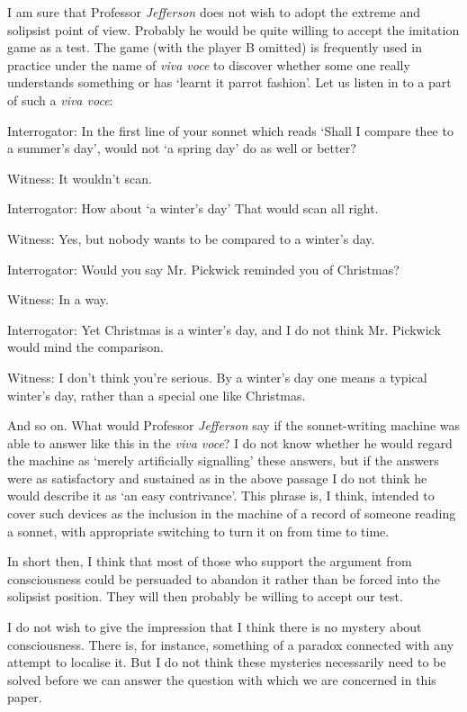 \documentclass[10pt]{article} %
\newcommand{\dialogueturn}[2]{%
    \noindent\normalfont #1: #2\par %
    \vspace{0.2\baselineskip}%
}
\begin{document}
I am sure that Professor \textit{Jefferson} does not wish to adopt the extreme and solipsist point of view. Probably he would be quite willing to accept the imitation game as a test. The game (with the player B omitted) is frequently used in practice under the name of \textit{viva voce} to discover whether some one really understands something or has `learnt it parrot fashion'. Let us listen in to a part of such a \textit{viva voce}:

\vspace{0.5\baselineskip} %
\dialogueturn{Interrogator}{In the first line of your sonnet which reads `Shall I compare thee to a summer's day', would not `a spring day' do as well or better?}
\dialogueturn{Witness}{It wouldn't scan.}
\dialogueturn{Interrogator}{How about `a winter's day' That would scan all right.}
\dialogueturn{Witness}{Yes, but nobody wants to be compared to a winter's day.}
\dialogueturn{Interrogator}{Would you say Mr. Pickwick reminded you of Christmas?}
\dialogueturn{Witness}{In a way.}
\dialogueturn{Interrogator}{Yet Christmas is a winter's day, and I do not think Mr. Pickwick would mind the comparison.}
\dialogueturn{Witness}{I don't think you're serious. By a winter's day one means a typical winter's day, rather than a special one like Christmas.}

And so on. What would Professor \textit{Jefferson} say if the sonnet-writing machine was able to answer like this in the \textit{viva voce}? I do not know whether he would regard the machine as `merely artificially signalling' these answers, but if the answers were as satisfactory and sustained as in the above passage I do not think he would describe it as `an easy contrivance'. This phrase is, I think, intended to cover such devices as the inclusion in the machine of a record of someone reading a sonnet, with appropriate switching to turn it on from time to time.

In short then, I think that most of those who support the argument from consciousness could be persuaded to abandon it rather than be forced into the solipsist position. They will then probably be willing to accept our test.

I do not wish to give the impression that I think there is no mystery about consciousness. There is, for instance, something of a paradox connected with any attempt to localise it. But I do not think these mysteries necessarily need to be solved before we can answer the question with which we are concerned in this paper.
\vspace{0.5\baselineskip} %
\end{document}
